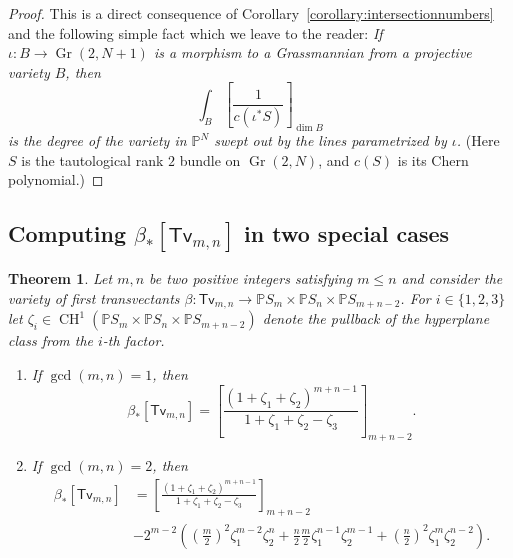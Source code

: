 \documentclass[12pt]{article}
\theoremstyle{plain}
\newtheorem{theorem}{Theorem}[section]
\theoremstyle{remark}
\renewcommand{\P}{\mathbb{P}}
\newcommand{\Gr}{\operatorname{Gr}}
\newcommand{\CH}{\operatorname{CH}}
\newcommand{\transvectant}{\mathsf{Tv}}
\begin{document}
\begin{proof}
    \label{proof:solutioninprinciple}
    This is a direct consequence of Corollary~\ref{corollary:intersectionnumbers} and the following simple fact which we leave to the reader: {\sl If $\iota: B \to \Gr(2,N+1)$ is a morphism to a Grassmannian from a projective variety $B$, then $$\int_{B} \left[ \frac{1}{c(\iota^{*} S)} \right]_{\dim B}$$ is the degree of the variety in $\P^{N}$ swept out by the lines parametrized by $\iota$.} (Here $S$ is the tautological rank $2$ bundle on $\Gr(2,N)$, and $c(S)$ is its Chern polynomial.)
\end{proof}

\subsection{Computing $\beta_{*}[\transvectant_{m,n}]$ in two special cases}


\begin{theorem}
    \label{theorem:czvclass} Let $m, n$ be two positive integers satisfying $m \leq n$ and consider the variety of first transvectants $\beta: \transvectant_{m,n} \to \P S_{m} \times \P S_{n} \times \P S_{m+n-2}$. For $i \in \{1,2,3\}$ let $\zeta_{i} \in \CH^{1}(\P S_{m} \times \P S_{n} \times \P S_{m+n-2})$ denote the pullback of the hyperplane class from the $i$-th factor.
    \begin{enumerate}
        \item If $\gcd(m,n) = 1$, then
        \[
        \beta_{*}[\transvectant_{m,n}] = \left[\frac{(1+\zeta_{1}+\zeta_{2})^{m+n-1}}{1+\zeta_{1}+\zeta_{2}-\zeta_{3}} \right]_{m+n-2}.
        \]
        \item  If $\gcd(m,n) = 2$, then
        \begin{align*}
        \beta_{*}[\transvectant_{m,n}] & =  \left[\frac{(1+\zeta_{1}+\zeta_{2})^{m+n-1}}{1+\zeta_{1}+\zeta_{2}-\zeta_{3}} \right]_{m+n-2} \\
        & - 2^{m-2}\left(\left(\frac{m}{2}\right)^{2}\zeta_{1}^{m-2}\zeta_{2}^{n} + \frac{n}{2}\frac{m}{2}\zeta_{1}^{n-1}\zeta_{2}^{m-1} + \left(\frac{n}{2}\right)^{2}\zeta_{1}^{m}\zeta_{2}^{n-2}\right).
        \end{align*}
    \end{enumerate}
    \end{theorem}
\end{document}
